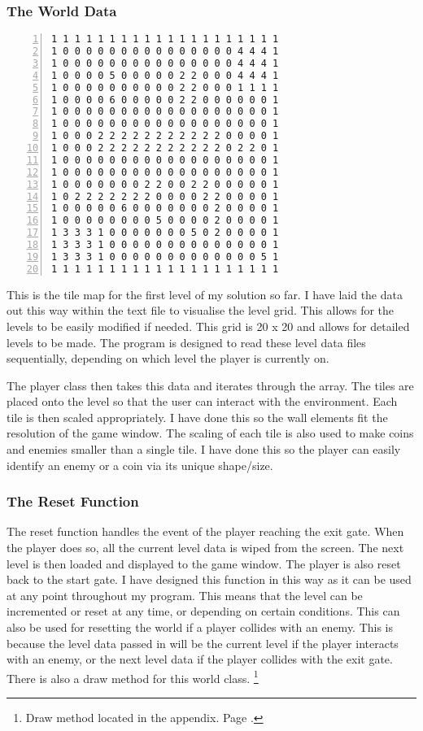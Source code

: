 \documentclass[12pt]{report}
\begin{document}
\subsubsection{The World Data}

\begin{Verbatim}[numbers=left, frame=single]
1 1 1 1 1 1 1 1 1 1 1 1 1 1 1 1 1 1 1 1
1 0 0 0 0 0 0 0 0 0 0 0 0 0 0 0 4 4 4 1
1 0 0 0 0 0 0 0 0 0 0 0 0 0 0 0 4 4 4 1
1 0 0 0 0 5 0 0 0 0 0 2 2 0 0 0 4 4 4 1
1 0 0 0 0 0 0 0 0 0 0 2 2 0 0 0 1 1 1 1
1 0 0 0 0 6 0 0 0 0 0 2 2 0 0 0 0 0 0 1
1 0 0 0 0 0 0 0 0 0 0 0 0 0 0 0 0 0 0 1
1 0 0 0 0 0 0 0 0 0 0 0 0 0 0 0 0 0 0 1
1 0 0 0 2 2 2 2 2 2 2 2 2 2 2 0 0 0 0 1
1 0 0 0 2 2 2 2 2 2 2 2 2 2 2 0 2 2 0 1
1 0 0 0 0 0 0 0 0 0 0 0 0 0 0 0 0 0 0 1
1 0 0 0 0 0 0 0 0 0 0 0 0 0 0 0 0 0 0 1
1 0 0 0 0 0 0 0 2 2 0 0 2 2 0 0 0 0 0 1
1 0 2 2 2 2 2 2 2 0 0 0 0 2 2 0 0 0 0 1
1 0 0 0 0 0 6 0 0 0 0 0 0 0 2 0 0 0 0 1
1 0 0 0 0 0 0 0 0 5 0 0 0 0 2 0 0 0 0 1
1 3 3 3 1 0 0 0 0 0 0 0 5 0 2 0 0 0 0 1
1 3 3 3 1 0 0 0 0 0 0 0 0 0 0 0 0 0 0 1
1 3 3 3 1 0 0 0 0 0 0 0 0 0 0 0 0 0 5 1
1 1 1 1 1 1 1 1 1 1 1 1 1 1 1 1 1 1 1 1
\end{Verbatim}

This is the tile map for the first level of my solution so far. I have laid the data out this way within the text file to visualise the level grid. This allows for the levels to be easily modified if needed. This grid is 20 x 20 and allows for detailed levels to be made. The program is designed to read these level data files sequentially, depending on which level the player is currently on. \newline

The player class then takes this data and iterates through the array. The tiles are placed onto the level so that the user can interact with the environment. Each tile is then scaled appropriately. I have done this so the wall elements fit the resolution of the game window. The scaling of each tile is also used to make coins and enemies smaller than a single tile. I have done this so the player can easily identify an enemy or a coin via its unique shape/size. 

\pagebreak

\subsubsection{The Reset Function}
The reset function handles the event of the player reaching the exit gate. When the player does so, all the current level data is wiped from the screen. The next level is then loaded and displayed to the game window. The player is also reset back to the start gate. I have designed this function in this way as it can be used at any point throughout my program. This means that the level can be incremented or reset at any time, or depending on certain conditions. This can also be used for resetting the world if a player collides with an enemy. This is because the level data passed in will be the current level if the player interacts with an enemy, or the next level data if the player collides with the exit gate. There is also a draw method for this world class. \footnote{Draw method located in the appendix. Page \pageref{appendix}.}
\end{document}
